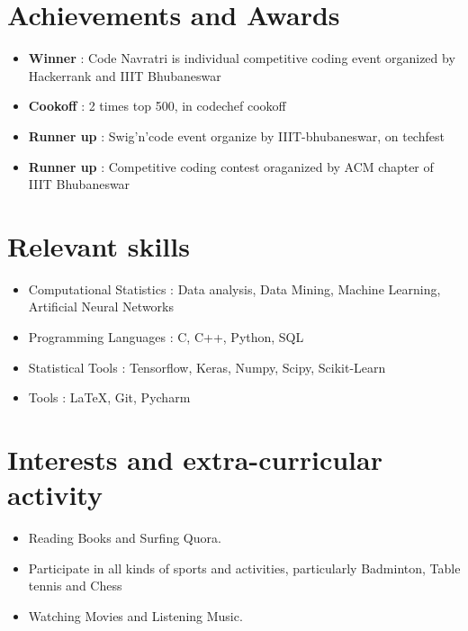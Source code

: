 \documentclass[11pt,a4paper,roman]{moderncv}
\begin{document}
    \section{Achievements and Awards}
    \vspace{6pt}
    \begin{itemize}
    \item \textbf{Winner} : Code Navratri is individual competitive coding event organized by Hackerrank and IIIT Bhubaneswar
    \vspace{3pt}
    \item \textbf{Cookoff} : 2 times top 500, in codechef cookoff
    \vspace{3pt}
    \item \textbf{Runner up} : Swig'n'code event organize by IIIT-bhubaneswar, on techfest
    \vspace{3pt}
    \item \textbf{Runner up} : Competitive coding contest oraganized by ACM chapter of IIIT Bhubaneswar
    \end{itemize}

    \section{Relevant skills}
    \vspace{6pt}
    \begin{itemize}
    \item Computational Statistics : Data analysis, Data Mining, Machine Learning, Artificial Neural Networks
    \vspace{3pt}
    \item Programming Languages : C, C++, Python, SQL
    \vspace{3pt}
    \item Statistical Tools : Tensorflow, Keras, Numpy, Scipy, Scikit-Learn
    \vspace{3pt}
    \item Tools : \LaTeX, Git, Pycharm
    \end{itemize}

    \section{Interests and extra-curricular activity}
    \vspace{6pt}
    \begin{itemize}
    \item{Reading Books and Surfing Quora.}
    \vspace{3pt}
    \item{Participate in all kinds of sports and activities, particularly Badminton, Table tennis and Chess}
    \vspace{3pt}
    \item{    Watching Movies and Listening Music.}
    \vspace{6pt}
    \end{itemize}
\end{document}
